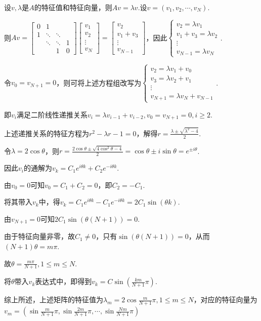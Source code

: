 \documentclass[a4paper,11pt]{ctexart}
\begin{document}
设$v,\lambda$是$A$的特征值和特征向量，则$Av=\lambda v$.设$v=(v_1,v_2,\cdots,v_N)$.\par
则$Av=\begin{bmatrix}
    0 & 1 & &\\
    1 & \ddots & \ddots & \\
    & \ddots & \ddots & 1\\
    & & 1 & 0
\end{bmatrix}\begin{bmatrix}
    v_1\\
    v_2\\
    \vdots\\
    v_N
\end{bmatrix}=\begin{bmatrix}
    v_2 \\
    v_1+v_3\\
    \vdots\\
    v_{N-1}
\end{bmatrix}$，因此$\begin{cases}
v_2=\lambda v_1\\
v_1+v_3=\lambda v_2\\
\vdots\\
v_{N-1}=\lambda v_N
\end{cases}$.\par
令$v_0=v_{N+1}=0$，则可将上述方程组改写为$\begin{cases}
    v_2=\lambda v_1 + v_0 \\
    v_3=\lambda v_2 + v_1\\
    \vdots\\
    v_{N+1}=\lambda v_{N} + v_{N-1}
\end{cases}$.\par
即$v_i$满足二阶线性递推关系$v_i=\lambda v_{i-1}+v_{i-2},v_0=v_{N+1}=0,i\geq 2$.\par
上述递推关系的特征方程为$r^2-\lambda r-1=0$，解得$r=\frac{\lambda\pm\sqrt{\lambda^2-4}}{2}$.\par
令$\lambda=2\cos\theta$，则$r=\frac{2\cos\theta\pm\sqrt{4\cos^2\theta-4}}{2}=\cos\theta\pm i\sin\theta=e^{\pm i\theta}$.\par
因此$v_i$的通解为$v_k=C_1e^{i\theta k}+C_2e^{-i\theta k}$.\par
由$v_0=0$可知$v_0=C_1+C_2=0$，即$C_2=-C_1$.\par
将其带入$v_k$中，得$v_k=C_1 e^{i\theta k}-C_1 e^{-i\theta k}=2C_1\sin(\theta k)$.\par
由$v_{N+1}=0$可知$2C_1\sin(\theta(N+1))=0$.\par
由于特征向量非零，故$C_1\neq 0$，只有$\sin(\theta(N+1))=0$，从而$(N+1)\theta=m\pi$.\par
故$\theta=\frac{m\pi}{N+1},1\leq m\leq N$.\par
将$\theta$带入$v_k$表达式中，即得到$v_k=C\sin\left(\frac{km}{N+1}\pi\right)$.\par
综上所述，上述矩阵的特征值为$\lambda_m=2\cos\frac{m}{N+1}\pi,1\leq m\leq N$，对应的特征向量为$v_m=\left(\sin\frac{m}{N+1}\pi,\sin\frac{2m}{N+1}\pi,\cdots,\sin\frac{Nm}{N+1}\pi\right)$
\end{document}
